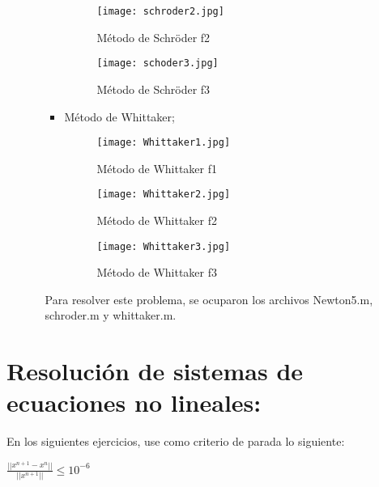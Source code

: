\documentclass{udpreport}
\begin{document}
\begin{enumerate}
\begin{enumerate}
\begin{itemize}
				\begin{figure}[H]
					\centering
					\texttt{[image: schroder2.jpg]}
					\caption{Método de Schröder f2}
				\end{figure}
				\begin{figure}[H]
					\centering
					\texttt{[image: schoder3.jpg]}
					\caption{Método de Schröder f3}
				\end{figure}
				 
				 
				 
				 \item Método de Whittaker;
				 \begin{figure}[H]
					\centering
						\texttt{[image: Whittaker1.jpg]}
						\caption{Método de Whittaker f1}
				\end{figure}
				\begin{figure}[H]
					\centering
						\texttt{[image: Whittaker2.jpg]}
						\caption{Método de Whittaker f2}
				\end{figure}
				\begin{figure}[H]
					\centering
						\texttt{[image: Whittaker3.jpg]}
						\caption{Método de Whittaker f3}
				\end{figure}
			\end{itemize}
			
			
			
			Para resolver este problema, se ocuparon los archivos Newton5.m, schroder.m y whittaker.m.
        \end{enumerate}
\end{enumerate}
\newpage
\chapter{Resolución de sistemas de ecuaciones no lineales:}
    
        
        En los siguientes ejercicios, use como criterio de parada lo siguiente:
        \begin{center}
            $ \frac{|| x^{n+1} - x^{n} ||}{|| x^{n+1} ||} \leq 10^{-6} $  
        \end{center}
        
\end{document}
